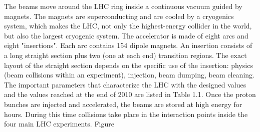 The beams move around the LHC ring inside a continuous vacuum guided by magnets.
The magnets are superconducting and are cooled by a cryogenics system, which makes
the LHC, not only the highest-energy collider in the world, but also the largest cryogenic
system.
The accelerator is made of eight arcs and eight "insertions". Each arc contains 154
dipole magnets. An insertion consists of a long straight section plus two (one at each end)
transition regions. The exact layout of the straight section depends on the specific use of
the insertion: physics (beam collisions within an experiment), injection, beam dumping,
beam cleaning. The important parameters that characterize the LHC with the designed
values and the values reached at the end of 2010 are listed in Table 1.1.
Once the proton bunches are injected and accelerated, the beams are stored at high
energy for hours. During this time collisions take place in the interaction points inside the
four main LHC experiments.
Figure









